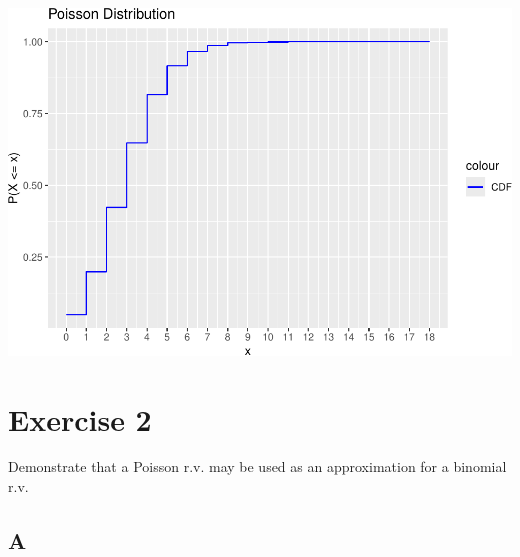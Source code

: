 \documentclass[
]{article}
\begin{document}
\includegraphics{es_files/figure-latex/unnamed-chunk-10-1.pdf}

\hypertarget{exercise-2}{%
\section{Exercise 2}\label{exercise-2}}

Demonstrate that a Poisson r.v. may be used as an approximation for a
binomial r.v.

\hypertarget{a-1}{%
\subsection{A}\label{a-1}}
\end{document}
